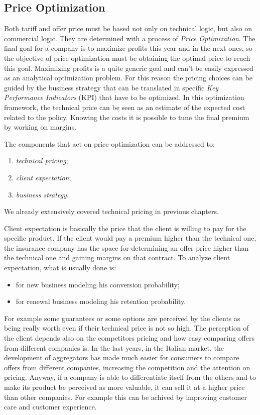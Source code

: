 \documentclass[a4paper, nobind]{templates/ociamthesis}
\providecommand{\tightlist}{%
  \setlength{\itemsep}{0pt}\setlength{\parskip}{0pt}}
\theoremstyle{definition}
\theoremstyle{definition}
\theoremstyle{definition}
\theoremstyle{remark}
\begin{document}
\hypertarget{price-optimization}{%
\subsection{Price Optimization}\label{price-optimization}}

Both tariff and offer price must be based not only on technical logic, but also on commercial logic. They are determined with a process of \emph{Price Optimization}. The final goal for a company is to maximize profits this year and in the next ones, so the objective of price optimization must be obtaining the optimal price to reach this goal. Maximizing profits is a quite generic goal and can't be easily expressed as an analytical optimization problem. For this reason the pricing choices can be guided by the business strategy that can be translated in specific \emph{Key Performance Indicators} (KPI) that have to be optimized. In this optimization framework, the technical price can be seen as an estimate of the expected cost related to the policy. Knowing the costs it is possible to tune the final premium by working on margins.

The components that act on price optimization can be addressed to:

\begin{enumerate}
\def\labelenumi{\arabic{enumi}.}
\tightlist
\item
  \emph{technical pricing};
\item
  \emph{client expectation};
\item
  \emph{business strategy}.
\end{enumerate}

We already extensively covered technical pricing in previous chapters.

Client expectation is basically the price that the client is willing to pay for the specific product. If the client would pay a premium higher than the technical one, the insurance company has the space for determining an offer price higher than the technical one and gaining margins on that contract. To analyze client expectation, what is usually done is:

\begin{itemize}
\tightlist
\item
  for new business modeling his conversion probability;
\item
  for renewal business modeling his retention probability.
\end{itemize}

For example some guarantees or some options are perceived by the clients as being really worth even if their technical price is not so high. The perception of the client depends also on the competitors pricing and how easy comparing offers from different companies is. In the last years, in the Italian market, the development of aggregators has made much easier for consumers to compare offers from different companies, increasing the competition and the attention on pricing. Anyway, if a company is able to differentiate itself from the others and to make its product be perceived as more valuable, it can sell it at a higher price than other companies. For example this can be achived by improving customer care and customer experience.
\end{document}
